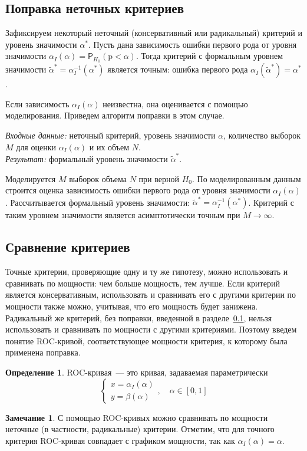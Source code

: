 \documentclass[specialist,
substylefile = spbu_report.rtx,
subf,12pt]{disser}
\newcommand{\Input}{\emph{Входные данные: }}
\newcommand{\Output}{\emph{Результат: }}
\theoremstyle{definition}
\newtheorem{definition}{Определение}[chapter]
\newtheorem{remark}{Замечание}[chapter]
\begin{document}
\subsection{Поправка неточных критериев}\label{sect:correction}
Зафиксируем некоторый неточный (консервативный или радикальный) критерий и уровень значимости $\alpha^*$. Пусть дана зависимость ошибки первого рода от уровня значимости $\alpha_I(\alpha)=\mathsf P_{H_0}(\mathrm p < \alpha)$. Тогда критерий с формальным уровнем значимости $\widetilde\alpha^*=\alpha_I^{-1}(\alpha^*)$ является точным: ошибка первого рода $\alpha_I(\widetilde\alpha^*)=\alpha^*$.

Если зависимость $\alpha_I(\alpha)$ неизвестна, она оценивается с помощью моделирования. Приведем алгоритм поправки в этом случае.
\begin{algorithm}
	\caption{Поправка уровня значимости по зависимости $\alpha_I(\alpha)$~\cite{Larin2022}\label{alg:correction}}
	\Input неточный критерий, уровень значимости $\alpha$, количество выборок $M$ для оценки $\alpha_I(\alpha)$ и их объем $N$.\\
	\Output формальный уровень значимости $\widetilde{\alpha}^*$.
	\begin{algorithmic}[1]
		\State Моделируется $M$ выборок объема $N$ при верной $H_0$.
		\State По моделированным данным строится оценка зависимость ошибки первого рода от уровня значимости $\alpha_I(\alpha)$.
		\State Рассчитывается формальный уровень значимости: $\widetilde{\alpha}^*=\alpha_I^{-1}(\alpha^*)$. Критерий с таким уровнем значимости является асимптотически точным при $M\to\infty$.
	\end{algorithmic}
\end{algorithm}

\subsection{Сравнение критериев}
Точные критерии, проверяющие одну и ту же гипотезу, можно использовать и сравнивать по мощности: чем больше мощность, тем лучше. Если критерий является консервативным, использовать и сравнивать его с другими критерии по мощности также можно, учитывая, что его мощность будет занижена. Радикальный же критерий, без поправки, введенной в разделе~\ref{sect:correction}, нельзя использовать и сравнивать по мощности с другими критериями. Поэтому введем понятие ROC-кривой, соответствующее мощности критерия, к которому была применена поправка.
\begin{definition}
	ROC-кривая~--- это кривая, задаваемая параметрически
	\[
		\begin{cases}
			x=\alpha_I(\alpha) \\
			y=\beta(\alpha)
		\end{cases},\quad \alpha\in[0,1]
	\]
\end{definition}
\begin{remark}
	С помощью ROC-кривых можно сравнивать по мощности неточные (в частности, радикальные) критерии. Отметим, что для точного критерия ROC-кривая совпадает с графиком мощности, так как $\alpha_I(\alpha)=\alpha$.
\end{remark}
\end{document}
